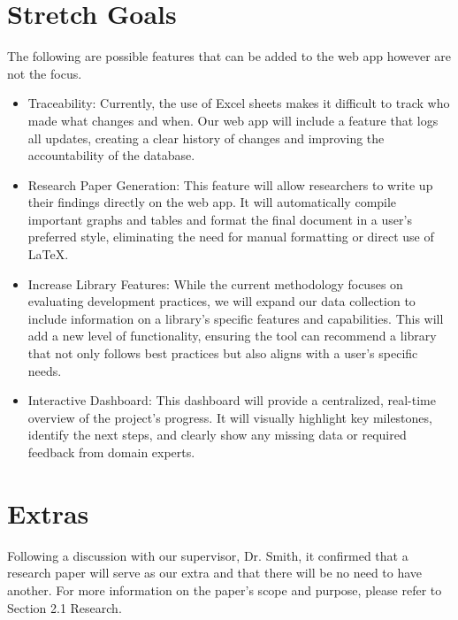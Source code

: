 \documentclass{article}
\begin{document}
\begin{itemize}
\begin{itemize}
\section{Stretch Goals}
The following are possible features that can be added to the web app however are not the focus.
\begin{itemize}
    \item Traceability: Currently, the use of Excel sheets makes it difficult to track who made what changes and when. Our web app will include a feature that logs all updates, creating a clear history of changes and improving the accountability of the database.
    \item Research Paper Generation: This feature will allow researchers to write up their findings directly on the web app. It will automatically compile important graphs and tables and format the final document in a user's preferred style, eliminating the need for manual formatting or direct use of LaTeX.
    \item Increase Library Features: While the current methodology focuses on evaluating development practices, we will expand our data collection to include information on a library's specific features and capabilities. This will add a new level of functionality, ensuring the tool can recommend a library that not only follows best practices but also aligns with a user's specific needs.
    \item Interactive Dashboard: This dashboard will provide a centralized, real-time overview of the project's progress. It will visually highlight key milestones, identify the next steps, and clearly show any missing data or required feedback from domain experts.
\end{itemize}
\section{Extras}
Following a discussion with our supervisor, Dr. Smith, it confirmed that a research paper will serve as our extra and that there will be no need to have another.
For more information on the paper's scope and purpose, please refer to Section 2.1 Research.



\end{itemize}
\end{itemize}
\end{document}
